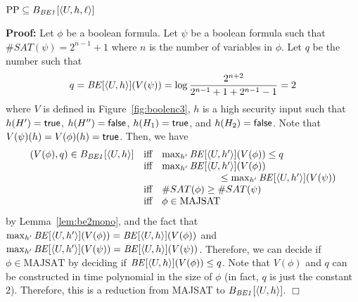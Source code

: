 \documentclass{llncs}
\newenvironment{proof}{\noindent\rm{\bf Proof:}}{\hbox{$\Box$}\vspace*{0.2\baselineskip}}
\newenvironment{reftheorem}[1]{\begin{trivlist}\item[\hskip
      \labelsep{\bf Theorem #1.}]\it}{\end{trivlist}}
\newcommand{\aseq}[1]{\langle#1\rangle}
\begin{document}
\begin{reftheorem}{\ref{thm:ppbe1}}
$\text{PP}\subseteq B_{\it BE1}[\aseq{U,h,\ell}]$
\end{reftheorem}
\begin{proof}
Let $\phi$ be a boolean formula.  Let $\psi$ be a boolean formula such that $\#SAT(\psi)=2^{n-1}+1$ where $n$ is the number of variables in $\phi$.  Let $q$ be the number such that
\[
q={\it BE}[\aseq{U,h}](V(\psi))=\log\frac{2^{n+2}}{2^{n-1}+1 + 2^{n-1}-1}=2
\]
where $V$ is defined in Figure~\ref{fig:boolenc3}, $h$ is a high
security input such that $h(H') = {\sf true}$, $h(H'') = {\sf false}$,
$h(H_1) = {\sf true}$, and $h(H_2) = {\sf false}$.  Note that
$V(\psi)(h)= V(\phi)(h) = {\sf true}$.  Then, we have
\[
\begin{array}{rcl}
(V(\phi),q)\in B_{\it BE1}[\aseq{U,h}]& \textrm{iff} &
\max_{h'} {\it BE}[\aseq{U,h'}](V(\phi))\leq q\\
& \textrm{iff}& \max_{h'} {\it BE}[\aseq{U,h'}](V(\phi))\\
&&\qquad\qquad\qquad\leq \max_{h'}{\it BE}[\aseq{U,h'}](V(\psi))\\
  &\textrm{iff}& \#SAT(\phi)\ge\#SAT(\psi)\\
  &\textrm{iff}& \phi\in\textrm{MAJSAT}
\end{array}
\]
by Lemma~\ref{lem:be2mono}, and the fact that $\max_{h'}{\it
  BE}[\aseq{U,h'}](V(\phi))={\it BE}[\aseq{U,h}](V(\phi))$ and
$\max_{h'}{\it BE}[\aseq{U,h'}](V(\psi))={\it
  BE}[\aseq{U,h}](V(\psi))$.  Therefore, we can decide if
$\phi\in\textrm{MAJSAT}$ by deciding if ${\it
  BE}[\aseq{U,h}](V(\phi))\le q$.  Note that $V(\phi)$ and $q$ can be
constructed in time polynomial in the size of $\phi$ (in fact, $q$ is
just the constant $2$).  Therefore, this is a reduction from
\textrm{MAJSAT} to $B_{\it BE1}[\aseq{U,h}]$.
\end{proof}
\end{document}
